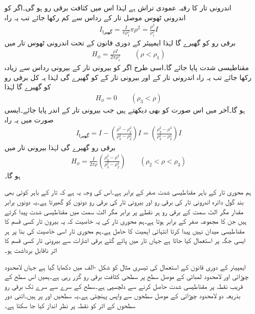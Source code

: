 اندرونی تار کا رقبہ عمودی تراش  ہے لہٰذا اس میں کثافت برقی رو  ہو گی۔اگر  کو اندرونی ٹھوس موصل تار کے رداس  سے کم رکھا جائے تب یہ راہ
\begin{align*}
I_{\textrm{گھیرا}}=\frac{I}{\pi \rho_1^2}\pi \rho^2=\frac{\rho^2}{\rho_1^2} I
\end{align*}
برقی رو کو گھیرے گا لہٰذا ایمپیئر کے دوری قانون کے تحت اندرونی ٹھوس تار میں
\begin{align*}
H_{\phi}=\frac{\rho I}{2\pi \rho_1^2} \quad \quad (\rho < \rho_1)
\end{align*}
مقناطیسی شدت پایا جائے گا۔اسی طرح اگر  کو بیرونی تار کے بیرونی رداس  سے زیادہ رکھا جائے تب یہ راہ اندرونی تار کے  اور بیرونی تار کے  کو گھیرے گی لہٰذا یہ  کل  برقی رو کو گھیرے گا لہٰذا 
\begin{align*}
H_{\phi} =0 \quad \quad (\rho_3 < \rho)
\end{align*}
ہو گا۔آخر میں اس صورت کو بھی دیکھتے ہیں جب  بیرونی تار کے اندر پایا جائے۔ایسی صورت میں یہ راہ
\begin{align*}
I_{\textrm{گھیرا}}=I-\left(\frac{\rho^2-\rho_2^2}{\rho_3^2-\rho_2^2}\right) I=\left(\frac{\rho_3^2-\rho^2}{\rho_3^2-\rho_2^2}\right)I
\end{align*}
برقی رو گھیرے گی لہٰذا بیرونی تار میں
\begin{align*}
H_{\phi}=\frac{I}{2\pi \rho} \left(\frac{\rho_3^2-\rho^2}{\rho_3^2-\rho_2^2} \right) \quad \quad (\rho_2<\rho<\rho_3)
\end{align*}
ہو گا۔ 

ہم محوری تار کے باہر مقناطیسی شدت صفر کے برابر ہے۔اس کی وجہ یہ ہے کہ تار کے باہر کوئی بھی بند گول دائرہ اندرونی تار کی برقی رو  اور بیرونی تار کی برقی رو  دونوں کو گھیرتا ہے۔یہ دونوں برابر مقدار مگر الٹ سمت کے برقی رو ہر نقطے پر برابر مگر الٹ سمت میں مقناطیسی شدت پیدا کرتے ہیں جن کا مجموعہ صفر کے برابر ہوتا ہے۔ہم محوری تار کی یہ خاصیت کہ یہ بیرون تار کسی قسم کا مقناطیسی میدان نہیں پیدا کرتا انتہائی اہمیت کا حامل ہے۔ہم محوری تار اسی خاصیت کی بنا پر ہر ایسی جگہ پر استعمال کیا جاتا ہے جہاں تار میں پائے گئے برقی اشارات سے بیرونی تار کسی قسم کا اثر ناقابل برداشت ہو۔

ایمپیئر کے دوری قانون کے استعمال کی تیسری مثال کو شکل -الف میں دکھایا گیا ہے جہاں  لامحدود چوڑائی اور لامحدود لمبائی کے موصل سطح پر  سطحی کثافت برقی رو گزر رہی ہے۔ہمیں اس سطح کے قریب نقطہ  پر مقناطیسی شدت حاصل کرنے سے دلچسپی ہے۔سطح کے  سرے سے  سرے تک برقی رو بذریعہ دو لامحدود چوڑائی کے موصل سطحوں سے واپس پہنچتی ہے۔یہ سطحیں  اور  پر ہیں۔اتنی دور سطحوں کے اثر کو نقطہ  پر نظر انداز کیا جا سکتا ہے۔

